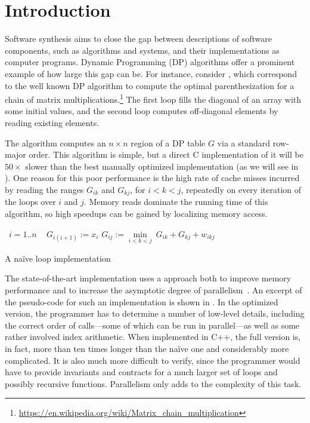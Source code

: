 \section{Introduction}
\label{intro}

\newcommand\ForLine[1]{\State\algorithmicfor~{#1} \algorithmicdo~}
\newcommand\Head[1]{\Comment{ {\it #1} ~~}}

Software synthesis aims to close the gap between descriptions of software components, such as algorithms and systems, and their implementations as computer programs. Dynamic Programming (DP) algorithms offer a prominent example of how large this gap can be. For instance, consider  
, which correspond to the well known DP algorithm to compute the optimal parenthesization for a chain of matrix multiplications.\footnote{\fontsize{6}{6}\selectfont\url{https://en.wikipedia.org/wiki/Matrix_chain_multiplication}}
The first loop fills the diagonal of an array with some initial values,
and the second loop computes off-diagonal elements by reading existing elements.

The algorithm computes an $n\times n$ region of a DP table $G$ via a standard row-major order. This algorithm is simple, but a direct C implementation of it will be 
$50\times$ slower than the best manually optimized implementation (as we will see in ). 
One reason for this poor performance is the high rate of cache misses incurred by reading the ranges $G_{ik}$ and $G_{kj}$, for $i<k<j$, repeatedly on every iteration of the loops over $i$ and $j$. Memory reads dominate the running time of this algorithm, so high speedups can be gained by localizing memory access.


\begin{algorithm}[t]
\renewcommand\arraystretch{1.3}
\begin{algorithmic}
  \ForLine{$i=1..n$}  $G_{i(i+1)} := x_i$    \Head{Initialize}
            \Head{Compute}
      \State $G_{ij} := \underset{i<k<j}\min ~ G_{ik} + G_{kj} + w_{ikj}$
    \EndFor
  \EndFor
\end{algorithmic}
\caption{\label{intro:naive}
   A na\"ive loop implementation}
\end{algorithm}


The state-of-the-art implementation uses a  approach both to improve memory performance and to increase the asymptotic degree of parallelism~\cite{IPDPS15/Tithi}. An excerpt of the pseudo-code for such an implementation is shown in . In the optimized version, the programmer has to determine a number of low-level details, including the correct order of calls---some of which can be run in parallel---as well as some rather involved index arithmetic. When implemented in C++, the full version is, in fact, more than ten times longer than the na\"ive one and considerably more complicated. It is also much more difficult to verify, since the programmer would have to provide invariants and contracts for a much larger set of loops and possibly recursive functions. Parallelism only adds to the complexity of this task.



